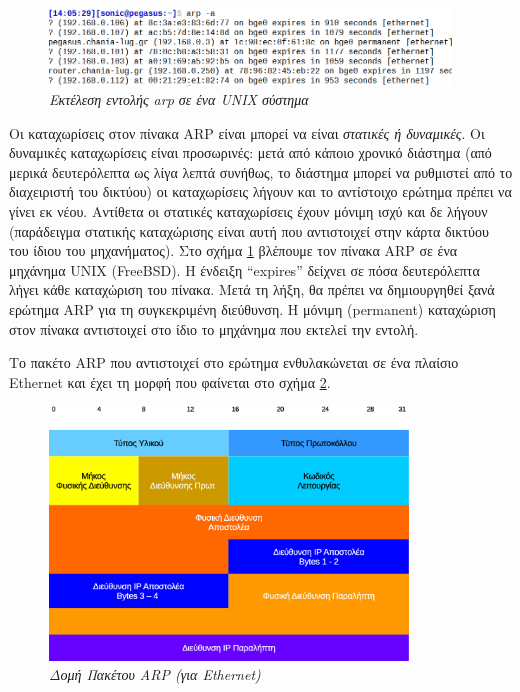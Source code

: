 \begin{figure}[!ht]
  \centering
  \includegraphics[width=0.95\textwidth]{images/chapter3/3-10}
  \caption {\textsl{Εκτέλεση εντολής arp σε ένα UNIX σύστημα}}
  \label{3-10}
\end{figure}

Οι καταχωρίσεις στον πίνακα ARP είναι μπορεί να είναι \emph{στατικές ή δυναμικές}. Οι δυναμικές καταχωρίσεις είναι προσωρινές: μετά από κάποιο χρονικό διάστημα (από μερικά δευτερόλεπτα ως λίγα λεπτά συνήθως, το διάστημα μπορεί να ρυθμιστεί από το διαχειριστή του δικτύου) οι καταχωρίσεις λήγουν και το αντίστοιχο ερώτημα πρέπει να γίνει εκ νέου. Αντίθετα οι στατικές καταχωρίσεις έχουν μόνιμη ισχύ και δε λήγουν (παράδειγμα στατικής καταχώρισης είναι αυτή που αντιστοιχεί στην κάρτα δικτύου του ίδιου του μηχανήματος). Στο σχήμα \ref{3-10} βλέπουμε τον πίνακα ARP σε ένα μηχάνημα UNIX (FreeBSD). Η ένδειξη ``expires'' δείχνει σε πόσα δευτερόλεπτα λήγει κάθε καταχώριση του πίνακα. Μετά τη λήξη, θα πρέπει να δημιουργηθεί ξανά ερώτημα ARP για τη συγκεκριμένη διεύθυνση. Η μόνιμη (permanent) καταχώριση στον πίνακα αντιστοιχεί στο ίδιο το μηχάνημα που εκτελεί την εντολή.

Το πακέτο ARP που αντιστοιχεί στο ερώτημα ενθυλακώνεται σε ένα πλαίσιο Ethernet και έχει τη μορφή που φαίνεται στο σχήμα \ref{3-11}. 

\begin{figure}[!ht]
 \centering
 \includegraphics[width=0.85\textwidth]{images/chapter3/3-11}
 \caption {\textsl{Δομή Πακέτου ARP (για Ethernet)}}
 \label{3-11}
\end{figure}

